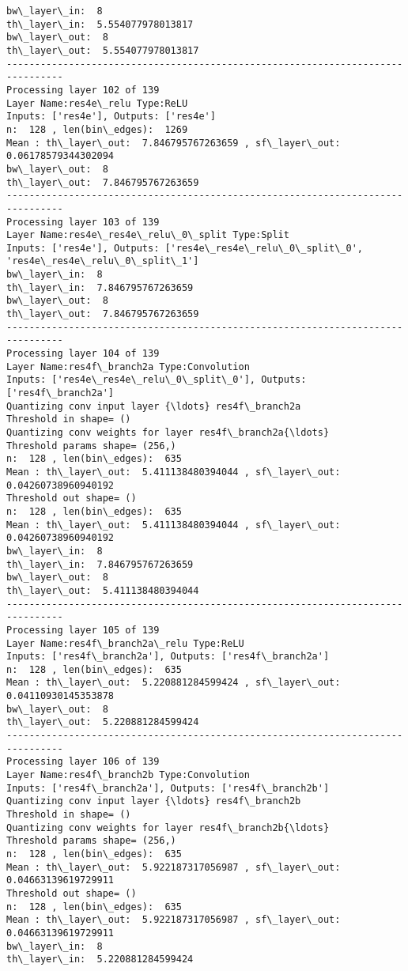 \documentclass[11pt]{article}
\begin{document}
\begin{Verbatim}[commandchars=\\\{\}]
bw\_layer\_in:  8
th\_layer\_in:  5.554077978013817
bw\_layer\_out:  8
th\_layer\_out:  5.554077978013817
--------------------------------------------------------------------------------
Processing layer 102 of 139
Layer Name:res4e\_relu Type:ReLU
Inputs: ['res4e'], Outputs: ['res4e']
n:  128 , len(bin\_edges):  1269
Mean : th\_layer\_out:  7.846795767263659 , sf\_layer\_out:  0.06178579344302094
bw\_layer\_out:  8
th\_layer\_out:  7.846795767263659
--------------------------------------------------------------------------------
Processing layer 103 of 139
Layer Name:res4e\_res4e\_relu\_0\_split Type:Split
Inputs: ['res4e'], Outputs: ['res4e\_res4e\_relu\_0\_split\_0', 'res4e\_res4e\_relu\_0\_split\_1']
bw\_layer\_in:  8
th\_layer\_in:  7.846795767263659
bw\_layer\_out:  8
th\_layer\_out:  7.846795767263659
--------------------------------------------------------------------------------
Processing layer 104 of 139
Layer Name:res4f\_branch2a Type:Convolution
Inputs: ['res4e\_res4e\_relu\_0\_split\_0'], Outputs: ['res4f\_branch2a']
Quantizing conv input layer {\ldots} res4f\_branch2a
Threshold in shape= ()
Quantizing conv weights for layer res4f\_branch2a{\ldots}
Threshold params shape= (256,)
n:  128 , len(bin\_edges):  635
Mean : th\_layer\_out:  5.411138480394044 , sf\_layer\_out:  0.04260738960940192
Threshold out shape= ()
n:  128 , len(bin\_edges):  635
Mean : th\_layer\_out:  5.411138480394044 , sf\_layer\_out:  0.04260738960940192
bw\_layer\_in:  8
th\_layer\_in:  7.846795767263659
bw\_layer\_out:  8
th\_layer\_out:  5.411138480394044
--------------------------------------------------------------------------------
Processing layer 105 of 139
Layer Name:res4f\_branch2a\_relu Type:ReLU
Inputs: ['res4f\_branch2a'], Outputs: ['res4f\_branch2a']
n:  128 , len(bin\_edges):  635
Mean : th\_layer\_out:  5.220881284599424 , sf\_layer\_out:  0.04110930145353878
bw\_layer\_out:  8
th\_layer\_out:  5.220881284599424
--------------------------------------------------------------------------------
Processing layer 106 of 139
Layer Name:res4f\_branch2b Type:Convolution
Inputs: ['res4f\_branch2a'], Outputs: ['res4f\_branch2b']
Quantizing conv input layer {\ldots} res4f\_branch2b
Threshold in shape= ()
Quantizing conv weights for layer res4f\_branch2b{\ldots}
Threshold params shape= (256,)
n:  128 , len(bin\_edges):  635
Mean : th\_layer\_out:  5.922187317056987 , sf\_layer\_out:  0.04663139619729911
Threshold out shape= ()
n:  128 , len(bin\_edges):  635
Mean : th\_layer\_out:  5.922187317056987 , sf\_layer\_out:  0.04663139619729911
bw\_layer\_in:  8
th\_layer\_in:  5.220881284599424

\end{Verbatim}
\end{document}
